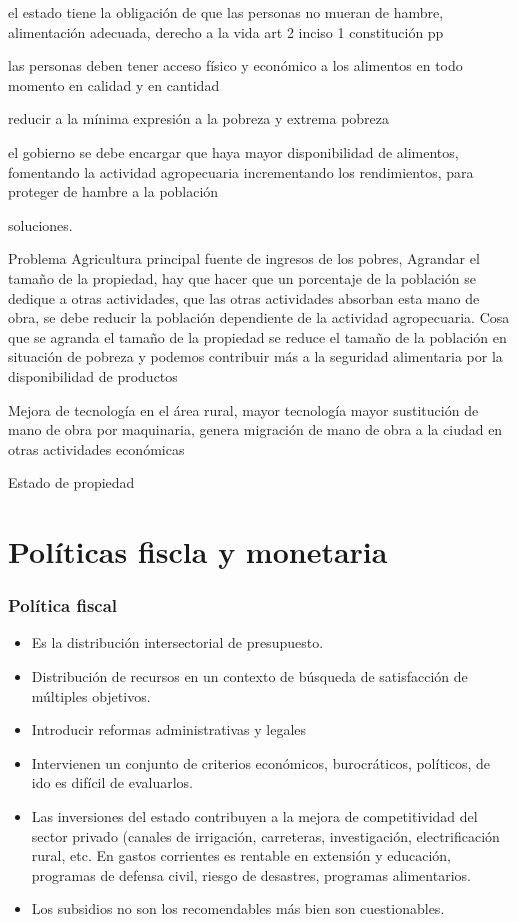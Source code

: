 \documentclass[
  a4paper,
]{article}
\providecommand{\tightlist}{%
  \setlength{\itemsep}{0pt}\setlength{\parskip}{0pt}}\usepackage{longtable,booktabs,array}
\begin{document}
el estado tiene la obligación de que las personas no mueran de hambre,
alimentación adecuada, derecho a la vida art 2 inciso 1 constitución pp

las personas deben tener acceso físico y económico a los alimentos en
todo momento en calidad y en cantidad

reducir a la mínima expresión a la pobreza y extrema pobreza

el gobierno se debe encargar que haya mayor disponibilidad de alimentos,
fomentando la actividad agropecuaria incrementando los rendimientos,
para proteger de hambre a la población

soluciones.

Problema Agricultura principal fuente de ingresos de los pobres,
Agrandar el tamaño de la propiedad, hay que hacer que un porcentaje de
la población se dedique a otras actividades, que las otras actividades
absorban esta mano de obra, se debe reducir la población dependiente de
la actividad agropecuaria. Cosa que se agranda el tamaño de la propiedad
se reduce el tamaño de la población en situación de pobreza y podemos
contribuir más a la seguridad alimentaria por la disponibilidad de
productos

Mejora de tecnología en el área rural, mayor tecnología mayor
sustitución de mano de obra por maquinaria, genera migración de mano de
obra a la ciudad en otras actividades económicas

Estado de propiedad

\hypertarget{poluxedticas-fiscla-y-monetaria}{%
\section{Políticas fiscla y
monetaria}\label{poluxedticas-fiscla-y-monetaria}}

\hypertarget{poluxedtica-fiscal}{%
\subsubsection{Política fiscal}\label{poluxedtica-fiscal}}

\begin{itemize}
\tightlist
\item
  Es la distribución intersectorial de presupuesto.
\item
  Distribución de recursos en un contexto de búsqueda de satisfacción de
  múltiples objetivos.
\item
  Introducir reformas administrativas y legales
\item
  Intervienen un conjunto de criterios económicos, burocráticos,
  políticos, de ido es difícil de evaluarlos.
\item
  Las inversiones del estado contribuyen a la mejora de competitividad
  del sector privado (canales de irrigación, carreteras, investigación,
  electrificación rural, etc. En gastos corrientes es rentable en
  extensión y educación, programas de defensa civil, riesgo de
  desastres, programas alimentarios.
\item
  Los subsidios no son los recomendables más bien son cuestionables.
\end{itemize}
\end{document}
